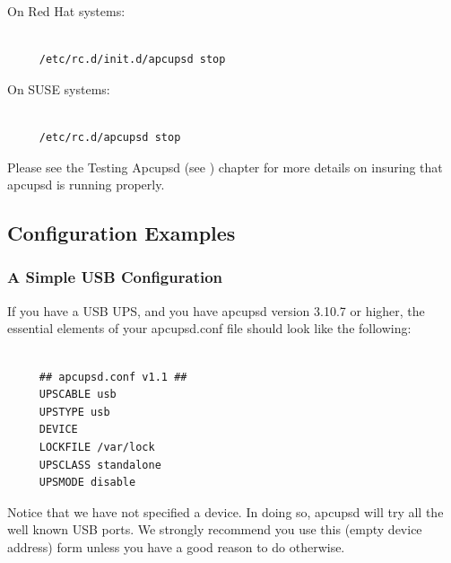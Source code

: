 On Red Hat systems: 

\footnotesize
\begin{verbatim}
     
     /etc/rc.d/init.d/apcupsd stop
\end{verbatim}
\normalsize

On SUSE systems: 

\footnotesize
\begin{verbatim}
     
     /etc/rc.d/apcupsd stop
\end{verbatim}
\normalsize

Please see the Testing Apcupsd (see 
) chapter for more details
on insuring that apcupsd is running properly. 

\label{Configuration-Examples}

\subsection*{Configuration Examples}

\label{index-Configuration_002c-Examples-63}
\label{index-Examples_002c-Configuration-64}

\label{A-Simple-USB-Configuration}

\subsubsection*{A Simple USB Configuration}

\label{index-Configuration_002c-USB-65}
\label{index-USB_002c-configuration-66}
\label{index-Example_002c-USB-conf-67}
If you have a USB UPS, and you have apcupsd version 3.10.7 or higher, the
essential elements of your apcupsd.conf file should look like the following: 

\footnotesize
\begin{verbatim}
     
     ## apcupsd.conf v1.1 ##
     UPSCABLE usb
     UPSTYPE usb
     DEVICE
     LOCKFILE /var/lock
     UPSCLASS standalone
     UPSMODE disable
\end{verbatim}
\normalsize

Notice that we have not specified a device. In doing so, apcupsd will try all
the well known USB ports. We strongly recommend you use this (empty device
address) form unless you have a good reason to do otherwise.  

